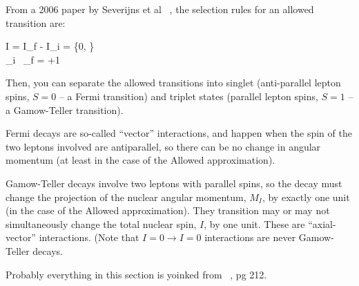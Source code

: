 	From a 2006 paper by Severijns et al ~\cite{severijns_beck_cuncic_2006}, the selection rules for an allowed transition are:
	
\bea
\Delta I = I_f - I_i = \{0, \} \\ 
\hat{\Pi}_i \, \hat{\Pi}_f = +1
\eea

	Then, you can separate the allowed transitions into singlet (anti-parallel lepton spins, $S=0$ -- a Fermi transition) and triplet states (parallel lepton spins, $S=1$ -- a Gamow-Teller transition).
	
	
	Fermi decays are so-called ``vector'' interactions, and happen when the spin of the two leptons involved are antiparallel, so there can be no change in angular momentum (at least in the case of the Allowed approximation).  
	
	Gamow-Teller decays involve two leptons with parallel spins, so the decay must change the projection of the nuclear angular momentum, $M_I$, by exactly one unit (in the case of the Allowed approximation).  They transition may or may not simultaneously change the total nuclear spin, $I$, by one unit.  These are ``axial-vector'' interactions.  (Note that $I=0 \rightarrow I=0$ interactions are never Gamow-Teller decays.  
	
	Probably everything in this section is yoinked from ~\cite{wong1990}, pg 212.  
	
	
%	
%	
%	
%
%
%
%
%
%
